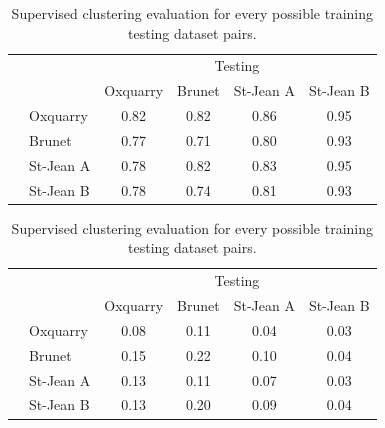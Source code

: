 \begin{table}
  \centering
  \caption{Supervised clustering evaluation for every possible training testing dataset pairs.}

  \label{tab:training_testing_f_1}
  \begin{tabular}{l l| c c c c}
    \toprule
    \multicolumn{2}{c}{\multirow{2}{*}{}} & \multicolumn{4}{c}{Testing}\\
    \multicolumn{2}{c}{}
                    & Oxquarry & Brunet & St-Jean A & St-Jean B \\
        \midrule
    \parbox[t]{2mm}{}
        & Oxquarry  & 0.82     & 0.82   & 0.86      & 0.95 \\
        & Brunet    & 0.77     & 0.71   & 0.80      & 0.93 \\
        & St-Jean A & 0.78     & 0.82   & 0.83      & 0.95 \\
        & St-Jean B & 0.78     & 0.74   & 0.81      & 0.93 \\
        \bottomrule
  \end{tabular}

  \label{tab:training_testing_r_diff}
  \begin{tabular}{l l|c c c c}
    \toprule
    \multicolumn{2}{c}{\multirow{2}{*}{}} & \multicolumn{4}{c}{Testing}\\
    \multicolumn{2}{c}{}
                    & Oxquarry & Brunet & St-Jean A & St-Jean B \\
        \midrule
    \parbox[t]{2mm}{}
        & Oxquarry  & 0.08     & 0.11   & 0.04      & 0.03          \\
        & Brunet    & 0.15     & 0.22   & 0.10      & 0.04          \\
        & St-Jean A & 0.13     & 0.11   & 0.07      & 0.03          \\
        & St-Jean B & 0.13     & 0.20   & 0.09      & 0.04          \\
        \bottomrule
  \end{tabular}
\end{table}
